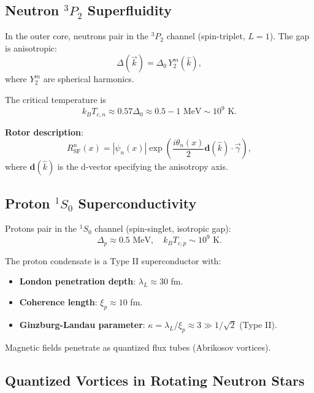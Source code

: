 \documentclass[12pt,a4paper]{article}
\theoremstyle{definition}
\theoremstyle{remark}
\begin{document}
\subsection{Neutron $^3P_2$ Superfluidity}

In the outer core, neutrons pair in the $^3P_2$ channel (spin-triplet, $L=1$). The gap is anisotropic:
\begin{equation}
\Delta(\vec{k}) = \Delta_0 \, Y_2^m(\hat{k}),
\end{equation}
where $Y_2^m$ are spherical harmonics.

The critical temperature is
\begin{equation}
k_B T_{c,n} \approx 0.57 \Delta_0 \approx 0.5-1 \text{ MeV} \sim 10^9 \text{ K}.
\end{equation}

\textbf{Rotor description}:
\begin{equation}
R_{\text{SF}}^n(x) = |\psi_n(x)| \exp\left(\frac{i\theta_n(x)}{2} \mathbf{d}(\hat{k}) \cdot \vec{\gamma}\right),
\end{equation}
where $\mathbf{d}(\hat{k})$ is the d-vector specifying the anisotropy axis.

\subsection{Proton $^1S_0$ Superconductivity}

Protons pair in the $^1S_0$ channel (spin-singlet, isotropic gap):
\begin{equation}
\Delta_p \approx 0.5 \text{ MeV}, \quad k_B T_{c,p} \sim 10^9 \text{ K}.
\end{equation}

The proton condensate is a Type II superconductor with:
\begin{itemize}
\item \textbf{London penetration depth}: $\lambda_L \approx 30$ fm.
\item \textbf{Coherence length}: $\xi_p \approx 10$ fm.
\item \textbf{Ginzburg-Landau parameter}: $\kappa = \lambda_L/\xi_p \approx 3 \gg 1/\sqrt{2}$ (Type II).
\end{itemize}

Magnetic fields penetrate as quantized flux tubes (Abrikosov vortices).

\subsection{Quantized Vortices in Rotating Neutron Stars}
\end{document}
